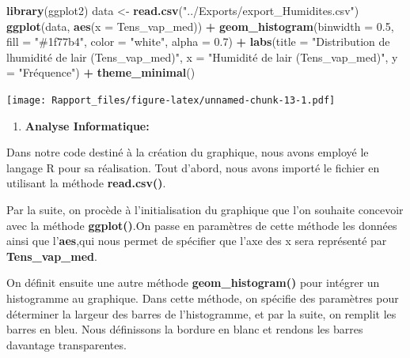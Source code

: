 \documentclass[
]{article}
\newenvironment{Shaded}{\begin{snugshade}}{\end{snugshade}}
\newcommand{\AttributeTok}[1]{\textcolor[rgb]{0.13,0.29,0.53}{#1}}
\newcommand{\FloatTok}[1]{\textcolor[rgb]{0.00,0.00,0.81}{#1}}
\newcommand{\FunctionTok}[1]{\textcolor[rgb]{0.13,0.29,0.53}{\textbf{#1}}}
\newcommand{\NormalTok}[1]{#1}
\newcommand{\OtherTok}[1]{\textcolor[rgb]{0.56,0.35,0.01}{#1}}
\newcommand{\SpecialCharTok}[1]{\textcolor[rgb]{0.81,0.36,0.00}{\textbf{#1}}}
\newcommand{\StringTok}[1]{\textcolor[rgb]{0.31,0.60,0.02}{#1}}
\providecommand{\tightlist}{%
  \setlength{\itemsep}{0pt}\setlength{\parskip}{0pt}}
\begin{document}
\begin{Shaded}
\begin{Highlighting}[]
\FunctionTok{library}\NormalTok{(ggplot2)}
\NormalTok{data }\OtherTok{\textless{}{-}} \FunctionTok{read.csv}\NormalTok{(}\StringTok{"../Exports/export\_Humidites.csv"}\NormalTok{)}
\FunctionTok{ggplot}\NormalTok{(data, }\FunctionTok{aes}\NormalTok{(}\AttributeTok{x =}\NormalTok{ Tens\_vap\_med)) }\SpecialCharTok{+}
  \FunctionTok{geom\_histogram}\NormalTok{(}\AttributeTok{binwidth =} \FloatTok{0.5}\NormalTok{, }\AttributeTok{fill =} \StringTok{"\#1f77b4"}\NormalTok{, }\AttributeTok{color =} \StringTok{"white"}\NormalTok{, }\AttributeTok{alpha =} \FloatTok{0.7}\NormalTok{) }\SpecialCharTok{+}
  \FunctionTok{labs}\NormalTok{(}\AttributeTok{title =} \StringTok{"Distribution de l\textquotesingle{}humidité de l\textquotesingle{}air (Tens\_vap\_med)"}\NormalTok{, }
       \AttributeTok{x =} \StringTok{"Humidité de l\textquotesingle{}air (Tens\_vap\_med)"}\NormalTok{, }
       \AttributeTok{y =} \StringTok{"Fréquence"}\NormalTok{) }\SpecialCharTok{+}
  \FunctionTok{theme\_minimal}\NormalTok{()}
\end{Highlighting}
\end{Shaded}

\texttt{[image: Rapport\_files/figure-latex/unnamed-chunk-13-1.pdf]}

\begin{enumerate}
\def\labelenumi{\arabic{enumi}.}
\tightlist
\item
  \textbf{Analyse Informatique:}
\end{enumerate}

Dans notre code destiné à la création du graphique, nous avons employé
le langage R pour sa réalisation. Tout d'abord, nous avons importé le
fichier en utilisant la méthode \textbf{read.csv()}.

Par la suite, on procède à l'initialisation du graphique que l'on
souhaite concevoir avec la méthode \textbf{ggplot()}.On passe en
paramètres de cette méthode les données ainsi que l'\textbf{aes},qui
nous permet de spécifier que l'axe des x sera représenté par
\textbf{Tens\_vap\_med}.

On définit ensuite une autre méthode \textbf{geom\_histogram()} pour
intégrer un histogramme au graphique. Dans cette méthode, on spécifie
des paramètres pour déterminer la largeur des barres de l'histogramme,
et par la suite, on remplit les barres en bleu. Nous définissons la
bordure en blanc et rendons les barres davantage transparentes.
\end{document}
